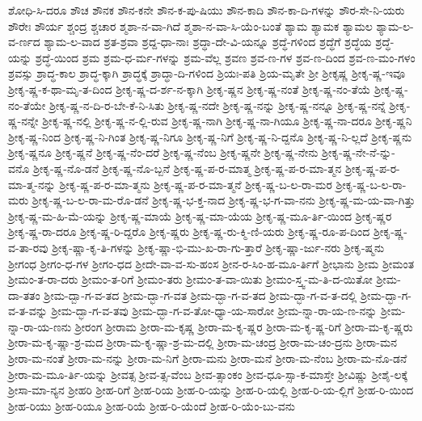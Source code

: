 {ಶೋಧಿ-ಸಿ-ದರೂ
ಶೌಚ
ಶೌನಕ
ಶೌನ-ಕನೇ
ಶೌನ-ಕ-ಪು-ಷಿಯು
ಶೌನ-ಕಾದಿ
ಶೌನ-ಕಾ-ದಿ-ಗಳನ್ನು
ಶೌರ-ಸೇ-ನಿ-ಯರು
ಶೌರೇಃ
ಶೌರ್ಯ
ಶ್ಚಂದ್ರ
ಶ್ಚಚಾರ
ಶ್ಮಶಾ-ನ-ವಾ-ಗಿದೆ
ಶ್ಮಶಾ-ನ-ವಾ-ಸಿ-ಯೆಂ-ಬಂತೆ
ಶ್ಯಾಮ
ಶ್ಯಾಮಕ
ಶ್ಯಾಮಲ
ಶ್ಯಾಮ-ಲ-ವ-ರ್ಣದ
ಶ್ಯಾಮ-ಲ-ವಾದ
ಶ್ರತ-ಶ್ರವಾ
ಶ್ರದ್ದ-ಧಾ-ನಾಃ
ಶ್ರದ್ಧಾ-ದೇ-ವಿ-ಯನ್ನೂ
ಶ್ರದ್ಧೆ-ಗಳಿಂದ
ಶ್ರದ್ಧೆಗೆ
ಶ್ರದ್ಧೆಯ
ಶ್ರದ್ಧೆ-ಯನ್ನು
ಶ್ರದ್ಧೆ-ಯಿಂದ
ಶ್ರಮ
ಶ್ರಮ-ಧ-ರ್ಮ-ಗಳನ್ನು
ಶ್ರಮ-ವೆಲ್ಲ
ಶ್ರವಣ
ಶ್ರವ-ಣ-ಗಳ
ಶ್ರವ-ಣ-ದಿಂದ
ಶ್ರವ-ಣ-ಮಂ-ಗಳಂ
ಶ್ರವಸ್ಸು
ಶ್ರಾದ್ಧ-ಕಾಲ
ಶ್ರಾದ್ಧ-ಕ್ಕಾಗಿ
ಶ್ರಾದ್ಧಕ್ಕೆ
ಶ್ರಾದ್ಧಾ-ದಿ-ಗಳಿಂದ
ಶ್ರಿಯಃ-ಪತಿ
ಶ್ರಿಯ-ಮೃತೇ
ಶ್ರೀ
ಶ್ರೀಕೃಷ್ಣ
ಶ್ರೀಕೃ-ಷ್ಣ-ಇವೂ
ಶ್ರೀಕೃ-ಷ್ಣ-ಕ-ಥಾ-ಮೃ-ತ-ದಿಂದ
ಶ್ರೀಕೃ-ಷ್ಣ-ದ-ರ್ಶ-ನ-ಕ್ಕಾಗಿ
ಶ್ರೀಕೃ-ಷ್ಣನ
ಶ್ರೀಕೃ-ಷ್ಣ-ನಂತೆ
ಶ್ರೀಕೃ-ಷ್ಣ-ನಂ-ತೆಯೆ
ಶ್ರೀಕೃ-ಷ್ಣ-ನಂ-ತೆಯೇ
ಶ್ರೀಕೃ-ಷ್ಣ-ನ-ದಿ-ರ-ಬೇ-ಕೆ-ನಿ-ಸಿತು
ಶ್ರೀಕೃ-ಷ್ಣ-ನದೇ
ಶ್ರೀಕೃ-ಷ್ಣ-ನನ್ನು
ಶ್ರೀಕೃ-ಷ್ಣ-ನನ್ನೂ
ಶ್ರೀಕೃ-ಷ್ಣ-ನನ್ನೆ
ಶ್ರೀಕೃ-ಷ್ಣ-ನನ್ನೇ
ಶ್ರೀಕೃ-ಷ್ಣ-ನಲ್ಲಿ
ಶ್ರೀಕೃ-ಷ್ಣ-ನ-ಲ್ಲಿ-ರುವ
ಶ್ರೀಕೃ-ಷ್ಣ-ನಾಗಿ
ಶ್ರೀಕೃ-ಷ್ಣ-ನಾ-ಗಿಯೂ
ಶ್ರೀಕೃ-ಷ್ಣ-ನಾ-ದರೂ
ಶ್ರೀಕೃ-ಷ್ಣನಿ
ಶ್ರೀಕೃ-ಷ್ಣ-ನಿಂದ
ಶ್ರೀಕೃ-ಷ್ಣ-ನಿ-ಗಿಂತ
ಶ್ರೀಕೃ-ಷ್ಣ-ನಿಗೂ
ಶ್ರೀಕೃ-ಷ್ಣ-ನಿಗೆ
ಶ್ರೀಕೃ-ಷ್ಣ-ನಿ-ದ್ದನೊ
ಶ್ರೀಕೃ-ಷ್ಣ-ನಿ-ಲ್ಲದೆ
ಶ್ರೀಕೃ-ಷ್ಣನು
ಶ್ರೀಕೃ-ಷ್ಣನೂ
ಶ್ರೀಕೃ-ಷ್ಣನೆ
ಶ್ರೀಕೃ-ಷ್ಣ-ನೆಂ-ದರೆ
ಶ್ರೀಕೃ-ಷ್ಣ-ನೆಂಬ
ಶ್ರೀಕೃ-ಷ್ಣನೇ
ಶ್ರೀಕೃ-ಷ್ಣ-ನೇನು
ಶ್ರೀಕೃ-ಷ್ಣ-ನೇ-ನೆ-ನ್ನು-ವನೊ
ಶ್ರೀಕೃ-ಷ್ಣ-ನೊ-ಡನೆ
ಶ್ರೀಕೃ-ಷ್ಣ-ನೊ-ಬ್ಬನೆ
ಶ್ರೀಕೃ-ಷ್ಣ-ಪ-ರ-ಮಾತ್ಮ
ಶ್ರೀಕೃ-ಷ್ಣ-ಪ-ರ-ಮಾ-ತ್ಮನ
ಶ್ರೀಕೃ-ಷ್ಣ-ಪ-ರ-ಮಾ-ತ್ಮ-ನನ್ನು
ಶ್ರೀಕೃ-ಷ್ಣ-ಪ-ರ-ಮಾ-ತ್ಮನು
ಶ್ರೀಕೃ-ಷ್ಣ-ಪ-ರ-ಮಾ-ತ್ಮನೆ
ಶ್ರೀಕೃ-ಷ್ಣ-ಬ-ಲ-ರಾ-ಮರ
ಶ್ರೀಕೃ-ಷ್ಣ-ಬ-ಲ-ರಾ-ಮರು
ಶ್ರೀಕೃ-ಷ್ಣ-ಬ-ಲ-ರಾ-ಮ-ರೊ-ಡನೆ
ಶ್ರೀಕೃ-ಷ್ಣ-ಭ-ಕ್ತ-ನಾದ
ಶ್ರೀಕೃ-ಷ್ಣ-ಭ-ಗ-ವಾ-ನನು
ಶ್ರೀಕೃ-ಷ್ಣ-ಮ-ಯ-ವಾ-ಗಿತ್ತು
ಶ್ರೀಕೃ-ಷ್ಣ-ಮ-ಹಿ-ಮೆ-ಯನ್ನು
ಶ್ರೀಕೃ-ಷ್ಣ-ಮಾಯೆ
ಶ್ರೀಕೃ-ಷ್ಣ-ಮಾ-ಯೆಯ
ಶ್ರೀಕೃ-ಷ್ಣ-ಮೂ-ರ್ತಿ-ಯಿಂದ
ಶ್ರೀಕೃ-ಷ್ಣರ
ಶ್ರೀಕೃ-ಷ್ಣ-ರಾ-ದರೂ
ಶ್ರೀಕೃ-ಷ್ಣ-ರಿ-ದ್ದರೊ
ಶ್ರೀಕೃ-ಷ್ಣರು
ಶ್ರೀಕೃ-ಷ್ಣ-ರು-ಕ್ಮಿ-ಣಿ-ಯರು
ಶ್ರೀಕೃ-ಷ್ಣ-ರೂ-ಪ-ದಿಂದ
ಶ್ರೀಕೃ-ಷ್ಣ-ವ-ತಾ-ರವು
ಶ್ರೀಕೃ-ಷ್ಣಾ-ಕೃ-ತಿ-ಗಳನ್ನು
ಶ್ರೀಕೃ-ಷ್ಣಾ-ಭಿ-ಮು-ಖ-ರಾ-ಗು-ತ್ತಾರೆ
ಶ್ರೀಕೃ-ಷ್ಣಾ-ರ್ಜು-ನರು
ಶ್ರೀಕೃ-ಷ್ಮನು
ಶ್ರೀಗಂಧ
ಶ್ರೀಗಂ-ಧ-ಗಳ
ಶ್ರೀಗಂ-ಧದ
ಶ್ರೀದೇ-ವಾ-ವ-ಸು-ಹಂಸ
ಶ್ರೀನ-ರ-ಸಿಂ-ಹ-ಮೂ-ರ್ತಿಗೆ
ಶ್ರೀಭಾನು
ಶ್ರೀಮ
ಶ್ರೀಮಂತ
ಶ್ರೀಮಂ-ತ-ರಾ-ದರು
ಶ್ರೀಮಂ-ತ-ರಿಗೆ
ಶ್ರೀಮಂ-ತರು
ಶ್ರೀಮಂ-ತ-ವಾ-ಯಿತು
ಶ್ರೀಮಂ-ಸ್ತ್ವ-ಮ-ತಿ-ದ-ಯಿತೋ
ಶ್ರೀಮ-ದಾ-ತತಂ
ಶ್ರೀಮ-ದ್ಬಾ-ಗ-ವ-ತದ
ಶ್ರೀಮ-ದ್ಭಾ-ಗ-ವತ
ಶ್ರೀಮ-ದ್ಭಾ-ಗ-ವ-ತದ
ಶ್ರೀಮ-ದ್ಭಾ-ಗ-ವ-ತ-ದಲ್ಲಿ
ಶ್ರೀಮ-ದ್ಭಾ-ಗ-ವ-ತ-ವನ್ನು
ಶ್ರೀಮ-ದ್ಭಾ-ಗ-ವ-ತವು
ಶ್ರೀಮ-ದ್ಭಾ-ಗ-ವ-ತೋ-ಧ್ಯಾ-ಯ-ಸಾರೋ
ಶ್ರೀಮ-ನ್ನಾ-ರಾ-ಯ-ಣ-ನನ್ನು
ಶ್ರೀಮ-ನ್ನಾ-ರಾ-ಯ-ಣನು
ಶ್ರೀರಂಗ
ಶ್ರೀರಾಮ
ಶ್ರೀರಾ-ಮ-ಕೃಷ್ಣ
ಶ್ರೀರಾ-ಮ-ಕೃ-ಷ್ಣರ
ಶ್ರೀರಾ-ಮ-ಕೃ-ಷ್ಣ-ರಿಗೆ
ಶ್ರೀರಾ-ಮ-ಕೃ-ಷ್ಣರು
ಶ್ರೀರಾ-ಮ-ಕೃ-ಷ್ಣಾ-ಶ್ರ-ಮದ
ಶ್ರೀರಾ-ಮ-ಕೃ-ಷ್ಣಾ-ಶ್ರ-ಮ-ದಲ್ಲಿ
ಶ್ರೀರಾ-ಮ-ಚಂದ್ರ
ಶ್ರೀರಾ-ಮ-ಚಂ-ದ್ರನು
ಶ್ರೀರಾ-ಮನ
ಶ್ರೀರಾ-ಮ-ನಂತೆ
ಶ್ರೀರಾ-ಮ-ನನ್ನು
ಶ್ರೀರಾ-ಮ-ನಿಗೆ
ಶ್ರೀರಾ-ಮನು
ಶ್ರೀರಾ-ಮನೆ
ಶ್ರೀರಾ-ಮ-ನೆಂಬ
ಶ್ರೀರಾ-ಮ-ನೊ-ಡನೆ
ಶ್ರೀರಾ-ಮ-ಮೂ-ರ್ತಿ-ಯನ್ನು
ಶ್ರೀವತ್ಸ
ಶ್ರೀವ-ತ್ಸ-ವೆಂಬ
ಶ್ರೀವ-ತ್ಸಾಂಕಂ
ಶ್ರೀವ-ಧೂ-ಸ್ಸಾ-ಕ-ಮಾಸ್ತೇ
ಶ್ರೀವಿಷ್ಣು
ಶ್ರೀಶೈ-ಲಕ್ಕೆ
ಶ್ರೀಸಾ-ಮಾ-ನ್ಯನ
ಶ್ರೀಹರಿ
ಶ್ರೀಹ-ರಿಗೆ
ಶ್ರೀಹ-ರಿಯ
ಶ್ರೀಹ-ರಿ-ಯನ್ನು
ಶ್ರೀಹ-ರಿ-ಯಲ್ಲಿ
ಶ್ರೀಹ-ರಿ-ಯ-ಲ್ಲಿಗೆ
ಶ್ರೀಹ-ರಿ-ಯಿಂದ
ಶ್ರೀಹ-ರಿಯು
ಶ್ರೀಹ-ರಿಯೂ
ಶ್ರೀಹ-ರಿಯೆ
ಶ್ರೀಹ-ರಿ-ಯೆಂದೆ
ಶ್ರೀಹ-ರಿ-ಯೆಂ-ಬು-ವನು
}
